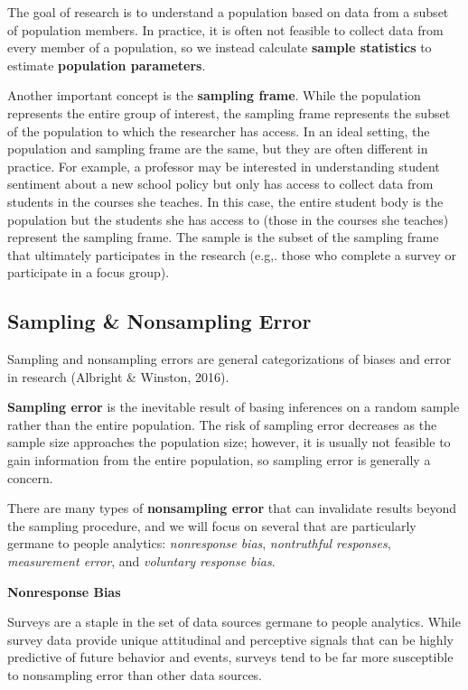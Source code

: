 \documentclass[]{book}
\begin{document}
The goal of research is to understand a population based on data from a subset of population members. In practice, it is often not feasible to collect data from every member of a population, so we instead calculate \textbf{sample statistics} to estimate \textbf{population parameters}.

Another important concept is the \textbf{sampling frame}. While the population represents the entire group of interest, the sampling frame represents the subset of the population to which the researcher has access. In an ideal setting, the population and sampling frame are the same, but they are often different in practice. For example, a professor may be interested in understanding student sentiment about a new school policy but only has access to collect data from students in the courses she teaches. In this case, the entire student body is the population but the students she has access to (those in the courses she teaches) represent the sampling frame. The sample is the subset of the sampling frame that ultimately participates in the research (e.g,. those who complete a survey or participate in a focus group).

\hypertarget{sampling-nonsampling-error}{%
\subsection{Sampling \& Nonsampling Error}\label{sampling-nonsampling-error}}

Sampling and nonsampling errors are general categorizations of biases and error in research (Albright \& Winston, 2016).

\textbf{Sampling error} is the inevitable result of basing inferences on a random sample rather than the entire population. The risk of sampling error decreases as the sample size approaches the population size; however, it is usually not feasible to gain information from the entire population, so sampling error is generally a concern.

There are many types of \textbf{nonsampling error} that can invalidate results beyond the sampling procedure, and we will focus on several that are particularly germane to people analytics: \emph{nonresponse bias}, \emph{nontruthful responses}, \emph{measurement error}, and \emph{voluntary response bias}.

\textbf{Nonresponse Bias}

Surveys are a staple in the set of data sources germane to people analytics. While survey data provide unique attitudinal and perceptive signals that can be highly predictive of future behavior and events, surveys tend to be far more susceptible to nonsampling error than other data sources.
\end{document}
